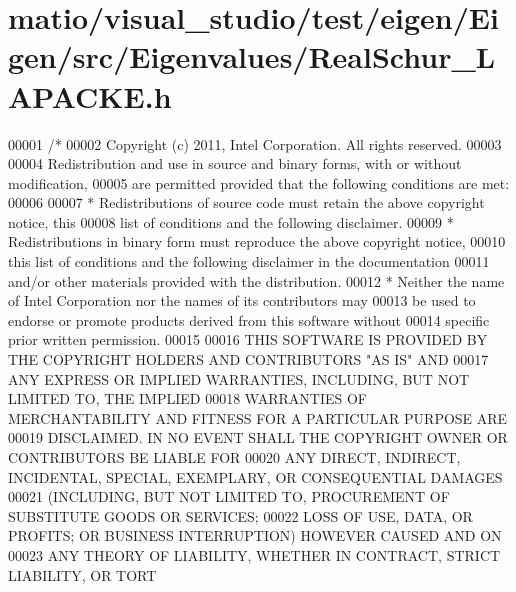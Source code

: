 \hypertarget{matio_2visual__studio_2test_2eigen_2_eigen_2src_2_eigenvalues_2_real_schur___l_a_p_a_c_k_e_8h_source}{}\section{matio/visual\+\_\+studio/test/eigen/\+Eigen/src/\+Eigenvalues/\+Real\+Schur\+\_\+\+L\+A\+P\+A\+C\+KE.h}
\label{matio_2visual__studio_2test_2eigen_2_eigen_2src_2_eigenvalues_2_real_schur___l_a_p_a_c_k_e_8h_source}

\begin{DoxyCode}
00001 \textcolor{comment}{/*}
00002 \textcolor{comment}{ Copyright (c) 2011, Intel Corporation. All rights reserved.}
00003 \textcolor{comment}{}
00004 \textcolor{comment}{ Redistribution and use in source and binary forms, with or without modification,}
00005 \textcolor{comment}{ are permitted provided that the following conditions are met:}
00006 \textcolor{comment}{}
00007 \textcolor{comment}{ * Redistributions of source code must retain the above copyright notice, this}
00008 \textcolor{comment}{   list of conditions and the following disclaimer.}
00009 \textcolor{comment}{ * Redistributions in binary form must reproduce the above copyright notice,}
00010 \textcolor{comment}{   this list of conditions and the following disclaimer in the documentation}
00011 \textcolor{comment}{   and/or other materials provided with the distribution.}
00012 \textcolor{comment}{ * Neither the name of Intel Corporation nor the names of its contributors may}
00013 \textcolor{comment}{   be used to endorse or promote products derived from this software without}
00014 \textcolor{comment}{   specific prior written permission.}
00015 \textcolor{comment}{}
00016 \textcolor{comment}{ THIS SOFTWARE IS PROVIDED BY THE COPYRIGHT HOLDERS AND CONTRIBUTORS "AS IS" AND}
00017 \textcolor{comment}{ ANY EXPRESS OR IMPLIED WARRANTIES, INCLUDING, BUT NOT LIMITED TO, THE IMPLIED}
00018 \textcolor{comment}{ WARRANTIES OF MERCHANTABILITY AND FITNESS FOR A PARTICULAR PURPOSE ARE}
00019 \textcolor{comment}{ DISCLAIMED. IN NO EVENT SHALL THE COPYRIGHT OWNER OR CONTRIBUTORS BE LIABLE FOR}
00020 \textcolor{comment}{ ANY DIRECT, INDIRECT, INCIDENTAL, SPECIAL, EXEMPLARY, OR CONSEQUENTIAL DAMAGES}
00021 \textcolor{comment}{ (INCLUDING, BUT NOT LIMITED TO, PROCUREMENT OF SUBSTITUTE GOODS OR SERVICES;}
00022 \textcolor{comment}{ LOSS OF USE, DATA, OR PROFITS; OR BUSINESS INTERRUPTION) HOWEVER CAUSED AND ON}
00023 \textcolor{comment}{ ANY THEORY OF LIABILITY, WHETHER IN CONTRACT, STRICT LIABILITY, OR TORT}

\end{DoxyCode}
